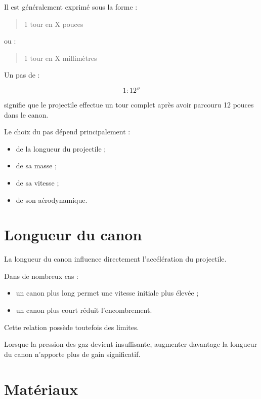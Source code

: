 Il est généralement exprimé sous la forme :

\begin{quote}
1 tour en X pouces
\end{quote}

ou :

\begin{quote}
1 tour en X millimètres
\end{quote}

\begin{exemple}

Un pas de :

\begin{equation}
1:12''
\end{equation}

signifie que le projectile effectue un tour complet après avoir parcouru
12 pouces dans le canon.

\end{exemple}

Le choix du pas dépend principalement :

\begin{itemize}
    \item de la longueur du projectile ;
    \item de sa masse ;
    \item de sa vitesse ;
    \item de son aérodynamique.
\end{itemize}

\section{Longueur du canon}

La longueur du canon influence directement l'accélération du projectile.

Dans de nombreux cas :

\begin{itemize}
    \item un canon plus long permet une vitesse initiale plus élevée ;
    \item un canon plus court réduit l'encombrement.
\end{itemize}

Cette relation possède toutefois des limites.

Lorsque la pression des gaz devient insuffisante, augmenter davantage la
longueur du canon n'apporte plus de gain significatif.

\section{Matériaux}

